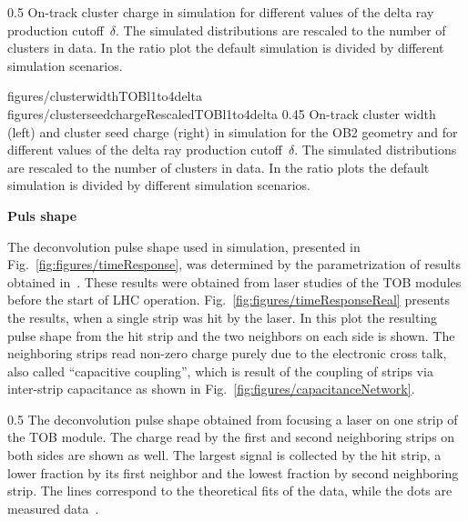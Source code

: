                  {0.5}       %
                 {  On-track cluster charge in simulation for different values of the delta ray production cutoff~$\delta$. The simulated distributions are rescaled to the number of clusters in data. In the ratio plot the default simulation is divided by different simulation scenarios. }

                 {figures/clusterwidthTOBl1to4delta}
                 {figures/clusterseedchargeRescaledTOBl1to4delta} %
                 {0.45}       %
                 {  On-track cluster width (left) and cluster seed charge (right) in simulation for the OB2 geometry and for different values of the delta ray production cutoff~$\delta$.  The simulated distributions are rescaled to the number of clusters in data. In the ratio plots the default simulation is divided by different simulation scenarios. }

\textbf{Puls shape}

The deconvolution pulse shape used in simulation, presented in Fig.~\ref{fig:figures/timeResponse}, was determined by the parametrization of results obtained in~\cite{Delaere:1061284}. These results were obtained from laser studies of the TOB modules before the start of LHC operation. Fig.~\ref{fig:figures/timeResponseReal} presents the results, when a single strip was hit by the laser. In this plot the resulting pulse shape from the hit strip and the two neighbors on each side is shown. The neighboring strips read non-zero charge purely due to the electronic cross talk, also called ``capacitive coupling'', which is result of the coupling of strips via inter-strip capacitance as shown in Fig.~\ref{fig:figures/capacitanceNetwork}. 



                 {0.5}       %
                 { The deconvolution pulse shape obtained from focusing a laser on one strip of the TOB module. The charge read by the first and second neighboring strips on both sides are shown as well. The largest signal is collected by the hit strip, a lower fraction by its first neighbor and the lowest fraction by second neighboring strip. The lines correspond to the theoretical fits of the data, while the dots are measured data~\cite{Delaere:1061284}.  }

